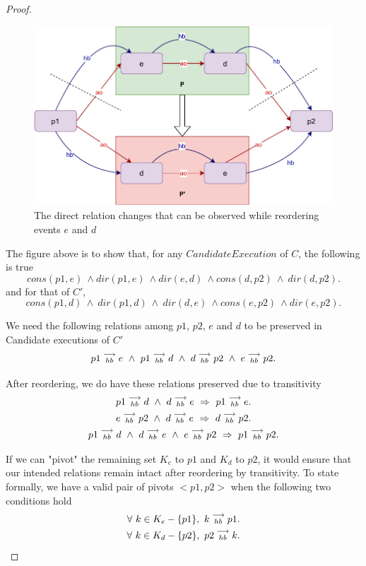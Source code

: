 \begin{proof}
        \begin{figure}[H]
            \centering
            \includegraphics[scale=0.7]{Q1(b).pdf}
            \caption{The direct relation changes that can be observed while reordering events $e$ and $d$}
            \label{fig:my_label}
        \end{figure}
        
        The figure above is to show that, for any $Candidate Execution$ of $C$, the following is true
        \[
            cons(p1,e) \ \wedge dir(p1,e) \ \wedge dir(e,d) \ \wedge cons(d,p2) \ \wedge \ dir(d,p2).
        \]
        and for that of $C'$,
        \[
            cons(p1,d) \ \wedge \ dir(p1,d) \ \wedge \ dir(d,e) \ \wedge cons(e,p2) \ \wedge dir(e,p2).
        \]
        
        We need the following relations among $p1$, $p2$, $e$ and $d$ to be preserved in Candidate executions of $C'$ 
        \[
            \reln{p1}{hb}{e} \ \wedge \ \reln{p1}{hb}{d} \ \wedge \ \reln{d}{hb}{p2} \ \wedge \ \reln{e}{hb}{p2}.
        \]
        
        After reordering, we do have these relations preserved due to transitivity  
        \begin{gather*}
            \reln{p1}{hb}{d} \ \wedge \ \reln{d}{hb}{e} \ \Rightarrow \ \reln{p1}{hb}{e}. \\
            \reln{e}{hb}{p2} \ \wedge \ \reln{d}{hb}{e} \ \Rightarrow \ \reln{d}{hb}{p2}. \\
            \reln{p1}{hb}{d} \ \wedge \ \reln{d}{hb}{e} \ \wedge \ \reln{e}{hb}{p2} \ \Rightarrow \ \reln{p1}{hb}{p2}. 
        \end{gather*}
    
        If we can "pivot" the remaining set $K_e$ to $p1$ and $K_d$ to $p2$, it would ensure that our intended relations remain intact after reordering by transitivity. To state formally, we have a valid pair of pivots $<p1,p2>$ when the following two conditions hold
        \begin{gather*}
            \forall \ k \in K_e - \{p1\}, \ k\stackrel{\longrightarrow}{_{hb}}p1. \\
            \forall \ k \in K_d - \{p2\}, \ p2\stackrel{\longrightarrow}{_{hb}}k.
        \end{gather*}
        

\end{proof}
